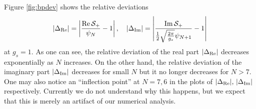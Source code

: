 \documentclass[11pt]{article}
\renewcommand{\[}{\begin{eqnarray}}
\renewcommand{\]}{\end{eqnarray}}
\begin{document}
%
Figure \ref{fig:bpdev} shows the relative deviations
%
\begin{align}
|\Delta_{\rm Re}|
 =\left|\frac{{\rm Re}\,\mathcal{S}_+}{\psi_N}-1\right|,
\quad
|\Delta_{\rm Im}|
 =\left|\frac{{\rm Im}\,\mathcal{S}_+}
             {\frac{1}{2}\sqrt{\frac{2\pi}{g_s}}\psi_{N+1}}
        -1\right|
\end{align}
%
at $g_s=1$.
As one can see, the relative deviation
of the real part
$|\Delta_{\rm Re}|$
decreases exponentially as $N$
increases.
On the other hand, the relative deviation
of the imaginary part
$|\Delta_{\rm Im}|$ decreases for small $N$
but it no longer decreases for $N> 7$.
One may also notice an ``inflection point'' at $N=7,6$ in
the plots of $|\Delta_{\rm Re}|,\,|\Delta_{\rm Im}|$ respectively.
Currently we do not understand why this happens,
but we expect that this is merely an artifact of our numerical analysis.
\end{document}
